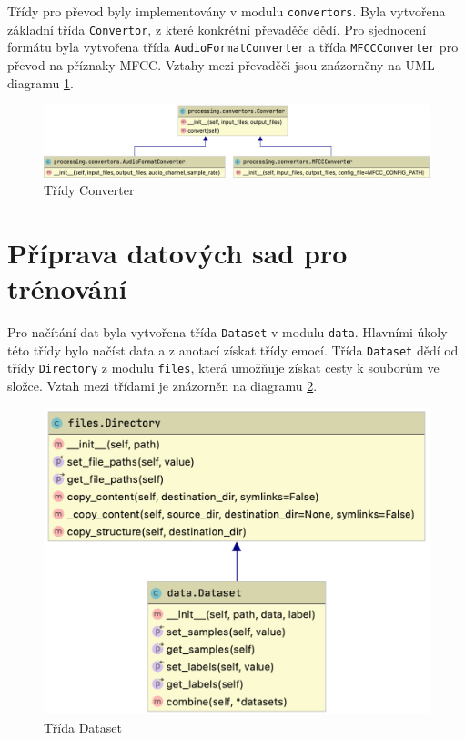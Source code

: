 \documentclass[FM,BP]{tulthesis}
\begin{document}
Třídy pro převod byly implementovány v modulu \texttt{\mbox{convertors}}. Byla vytvořena základní třída \texttt{\mbox{Convertor}}, z které konkrétní převaděče dědí. Pro sjednocení formátu byla vytvořena třída \texttt{\mbox{AudioFormatConverter}} a třída \texttt{\mbox{MFCCConverter}} pro převod na příznaky MFCC. Vztahy mezi převaděči jsou znázorněny na UML diagramu \mbox{\ref{fig:convertor}}.

\begin{figure}[ht]
\centerline{\includegraphics[width=\textwidth,height=\textheight,keepaspectratio]{convertors.png}}
\caption{Třídy Converter}
\label{fig:convertor}
\end{figure}
\FloatBarrier

\section{Příprava datových sad pro trénování} %
Pro načítání dat byla vytvořena třída \texttt{\mbox{Dataset}} v modulu \texttt{\mbox{data}}. Hlavními úkoly této třídy bylo načíst data a z anotací získat třídy emocí. Třída \texttt{\mbox{Dataset}} dědí od třídy \texttt{\mbox{Directory}} z modulu \texttt{\mbox{files}}, která umožňuje získat cesty k souborům ve složce. Vztah mezi třídami je znázorněn na diagramu \mbox{\ref{fig:datasets}}.

\begin{figure}[h!]
\centerline{\includegraphics[scale=.25,keepaspectratio]{data-dataset.png}}
\caption{Třída Dataset}
\label{fig:datasets}
\end{figure}
\FloatBarrier
\end{document}
